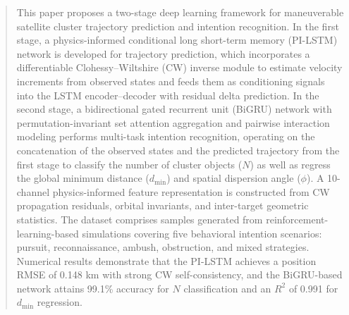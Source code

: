 \documentclass[a4paper,fleqn]{cas-dc}
\begin{document}


\begin{abstract}
    This paper proposes a two-stage deep learning framework for maneuverable satellite cluster trajectory prediction and intention recognition. In the first stage, a physics-informed conditional long short-term memory (PI-LSTM) network is developed for trajectory prediction, which incorporates a differentiable Clohessy--Wiltshire (CW) inverse module to estimate velocity increments from observed states and feeds them as conditioning signals into the LSTM encoder--decoder with residual delta prediction. In the second stage, a bidirectional gated recurrent unit (BiGRU) network with permutation-invariant set attention aggregation and pairwise interaction modeling performs multi-task intention recognition, operating on the concatenation of the observed states and the predicted trajectory from the first stage to classify the number of cluster objects ($N$) as well as regress the global minimum distance ($d_{\min}$) and spatial dispersion angle ($\phi$). A 10-channel physics-informed feature representation is constructed from CW propagation residuals, orbital invariants, and inter-target geometric statistics. The dataset comprises samples generated from reinforcement-learning-based simulations covering five behavioral intention scenarios: pursuit, reconnaissance, ambush, obstruction, and mixed strategies. Numerical results demonstrate that the PI-LSTM achieves a position RMSE of 0.148 km with strong CW self-consistency, and the BiGRU-based network attains 99.1\% accuracy for $N$ classification and an $R^2$ of 0.991 for $d_{\min}$ regression.
\end{abstract}
\end{document}
